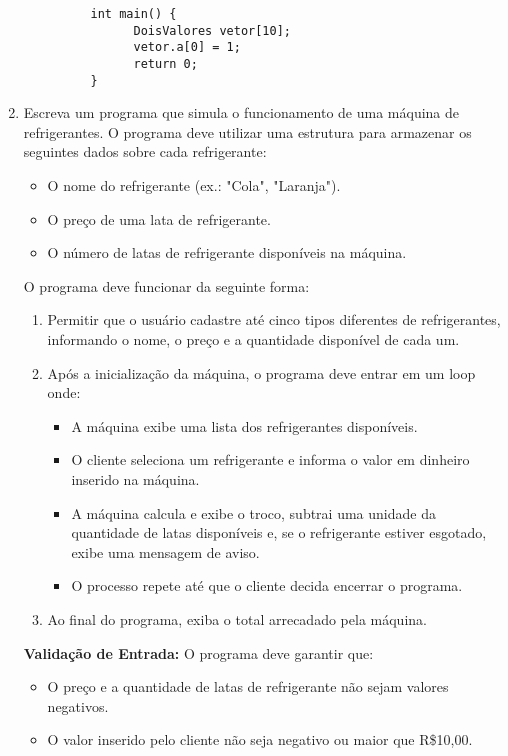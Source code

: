 \documentclass[12pt]{article}
\begin{document}
\begin{enumerate}
\begin{enumerate}
\begin{verbatim}
      int main() { 
            DoisValores vetor[10];  
            vetor.a[0] = 1; 
            return 0;
      }
                  \end{verbatim}
            \end{enumerate}

            \item Escreva um programa que simula o funcionamento de uma máquina de refrigerantes. O programa deve utilizar uma estrutura para armazenar os seguintes dados sobre cada refrigerante:
            \begin{itemize}
                \item O nome do refrigerante (ex.: "Cola", "Laranja").
                \item O preço de uma lata de refrigerante.
                \item O número de latas de refrigerante disponíveis na máquina.
            \end{itemize}
            
            O programa deve funcionar da seguinte forma:
            \begin{enumerate}
                \item Permitir que o usuário cadastre até cinco tipos diferentes de refrigerantes, informando o nome, o preço e a quantidade disponível de cada um.
                \item Após a inicialização da máquina, o programa deve entrar em um loop onde:
                \begin{itemize}
                    \item A máquina exibe uma lista dos refrigerantes disponíveis.
                    \item O cliente seleciona um refrigerante e informa o valor em dinheiro inserido na máquina.
                    \item A máquina calcula e exibe o troco, subtrai uma unidade da quantidade de latas disponíveis e, se o refrigerante estiver esgotado, exibe uma mensagem de aviso.
                    \item O processo repete até que o cliente decida encerrar o programa.
                \end{itemize}
                \item Ao final do programa, exiba o total arrecadado pela máquina.
            \end{enumerate}
            
            \textbf{Validação de Entrada:} O programa deve garantir que:
            \begin{itemize}
                \item O preço e a quantidade de latas de refrigerante não sejam valores negativos.
                \item O valor inserido pelo cliente não seja negativo ou maior que R\$10,00.
            \end{itemize}
            

\end{enumerate}
\end{document}
